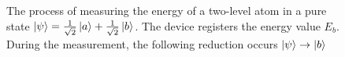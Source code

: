 \begin{figure}
\centering



\caption{The process of measuring the energy of a two-level atom in
a pure state $\left|\psi\right> = 
\frac{1}{\sqrt{2}}\ket{a} + \frac{1}{\sqrt{2}}\ket{b}$.
The device registers the energy value $E_b$. During the measurement,
the following reduction occurs $\left|\psi\right> \to \ket{b}$
}
\label{fig:add:mesure_ex_b}
\end{figure}